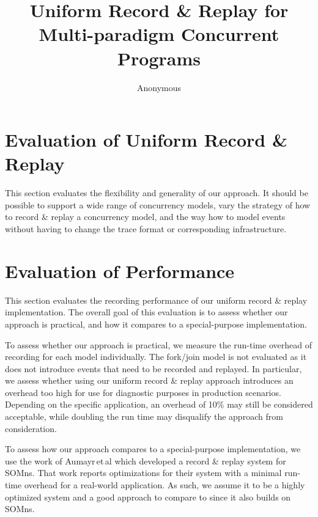 \documentclass[a4paper,UKenglish,cleveref,autoref]{lipics-v2019}
\title{Uniform Record \& Replay for Multi-paradigm Concurrent Programs }
\author{Anonymous}{Anonymous}{}{[orcid]}{[funding]}
\def\SOMns{SOM{\sc ns}\xspace}
\begin{document}
\maketitle


\begin{abstract}

\end{abstract}



\section{Evaluation of Uniform Record \& Replay}
This section evaluates the flexibility and generality of our approach.
It should be possible to support
a wide range of concurrency models,
vary the strategy of how to record \& replay a concurrency model,
and the way how to model events
without having to change the trace format or corresponding infrastructure.

\section{Evaluation of Performance}

This section evaluates the recording performance
of our uniform record \& replay implementation.
The overall goal of this evaluation is to assess whether our approach
is practical, and how it compares to a special-purpose implementation.

To assess whether our approach is practical, we measure the run-time overhead
of recording for each model individually.
The fork/join model is not evaluated
as it does not introduce events
that need to be recorded and replayed.
In particular, we assess whether using our uniform record \& replay approach
introduces an overhead too high for use for diagnostic purposes in production
scenarios.
Depending on the specific application, an overhead of 10\% may still
be considered acceptable,
while doubling the run time may disqualify the approach from consideration.

To assess how our approach compares to a special-purpose implementation, 
we use the work of 
Aumayr\,et\,al which developed a record \& replay system for \SOMns.
That work reports optimizations for their system
with a minimal run-time overhead for a real-world application.
As such, we assume it to be a highly optimized system
and a good approach to compare to since it also builds on \SOMns.
\end{document}
